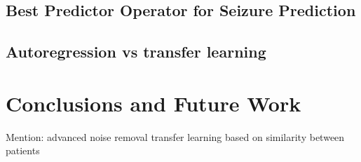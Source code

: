 \documentclass{article} %
\newcommand{\BibDir}{./bibliography}
\begin{document}
\subsection{Best Predictor Operator for Seizure Prediction}

\subsection{Autoregression vs transfer learning}

\section{Conclusions and Future Work} \label{sec:discuss}
Mention: advanced noise removal
transfer learning based on similarity between patients



\end{document}
